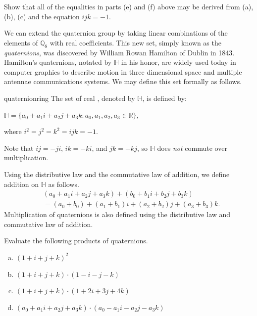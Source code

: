 \begin{exercise}{}
Show that all of the equalities in parts (e) and (f) above may be derived from (a), (b), (c) and the equation $ijk=-1$. 
\end{exercise}

We can extend the quaternion group by taking linear combinations of the elements of ${\mathbb Q}_8$ with real coefficients.  This new set, simply known as the \emph{quaternions}, was discovered by William Rowan Hamilton of Dublin in 1843.  Hamilton's quaternions, notated by ${\mathbb H}$ in his honor, are widely used today in computer graphics to describe motion in three dimensional space and multiple antennae communications systems.  We may define this set formally as follows.

\begin{defn}{quaternionring}
The set of real , denoted by ${\mathbb H}$, is defined by:
\begin{center}
${\mathbb H}=\{a_0+a_1i+a_2j+a_3k:a_0,a_1,a_2,a_3\in {\mathbb R}\}$,

where $i^2=j^2=k^2=ijk=-1$.
\end{center}

Note that $ij=-ji$, $ik=-ki$, and $jk=-kj$, so ${\mathbb H}$ does \emph{not} commute over multiplication.

Using the distributive law and the commutative law of addition, we define addition on ${\mathbb H}$ as follows.
\begin{equation}
\begin{aligned}
&(a_0+a_1i+a_2j+a_3k)+(b_0+b_1i+b_2j+b_3k)\\
&=(a_0+b_0)+(a_1+b_1)i+(a_2+b_2)j+(a_3+b_3)k.
\end{aligned}
\end{equation}
Multiplication of quaternions is also defined using the distributive law and commutative law of addition.
\end{defn}

\begin{exercise}{}
Evaluate the following products of quaternions.
\begin{enumerate}[(a)]
\item $(1+i+j+k)^2$
\item $(1+i+j+k)\cdot (1-i-j-k)$
\item $(1+i+j+k) \cdot (1+2i+3j+4k)$
\item $(a_0+a_1i+a_2j+a_3k)\cdot (a_0-a_1i-a_2j-a_3k)$
\end{enumerate}
\end{exercise}


